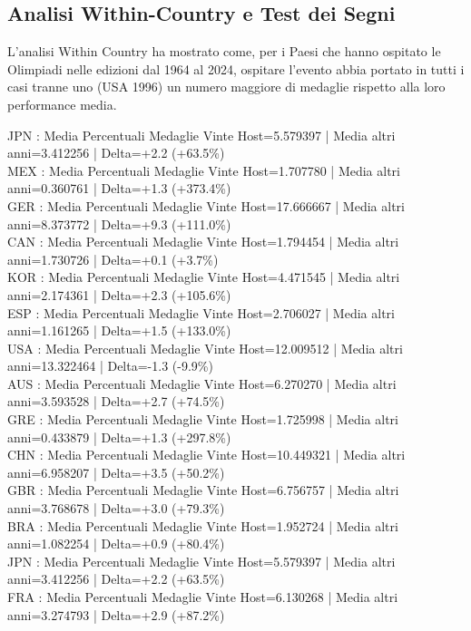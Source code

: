 \subsection{Analisi Within-Country e Test dei Segni}\label{sec:results_regression}


L’analisi Within Country ha mostrato come, per i Paesi che hanno ospitato le Olimpiadi nelle edizioni dal 1964 al 2024, ospitare l’evento abbia portato in tutti i casi tranne uno (USA 1996) un numero maggiore di medaglie rispetto alla loro performance media.

\medskip
\noindent JPN : Media Percentuali Medaglie Vinte Host=5.579397 | Media altri anni=3.412256 | Delta=+2.2 (+63.5\%) \\
MEX : Media Percentuali Medaglie Vinte Host=1.707780 | Media altri anni=0.360761 | Delta=+1.3 (+373.4\%) \\
GER : Media Percentuali Medaglie Vinte Host=17.666667 | Media altri anni=8.373772 | Delta=+9.3 (+111.0\%) \\
CAN : Media Percentuali Medaglie Vinte Host=1.794454 | Media altri anni=1.730726 | Delta=+0.1 (+3.7\%) \\
KOR : Media Percentuali Medaglie Vinte Host=4.471545 | Media altri anni=2.174361 | Delta=+2.3 (+105.6\%) \\
ESP : Media Percentuali Medaglie Vinte Host=2.706027 | Media altri anni=1.161265 | Delta=+1.5 (+133.0\%) \\
USA : Media Percentuali Medaglie Vinte Host=12.009512 | Media altri anni=13.322464 | Delta=-1.3 (-9.9\%) \\
AUS : Media Percentuali Medaglie Vinte Host=6.270270 | Media altri anni=3.593528 | Delta=+2.7 (+74.5\%) \\
GRE : Media Percentuali Medaglie Vinte Host=1.725998 | Media altri anni=0.433879 | Delta=+1.3 (+297.8\%) \\
CHN : Media Percentuali Medaglie Vinte Host=10.449321 | Media altri anni=6.958207 | Delta=+3.5 (+50.2\%) \\
GBR : Media Percentuali Medaglie Vinte Host=6.756757 | Media altri anni=3.768678 | Delta=+3.0 (+79.3\%) \\
BRA : Media Percentuali Medaglie Vinte Host=1.952724 | Media altri anni=1.082254 | Delta=+0.9 (+80.4\%) \\
JPN : Media Percentuali Medaglie Vinte Host=5.579397 | Media altri anni=3.412256 | Delta=+2.2 (+63.5\%) \\
FRA : Media Percentuali Medaglie Vinte Host=6.130268 | Media altri anni=3.274793 | Delta=+2.9 (+87.2\%) \\

